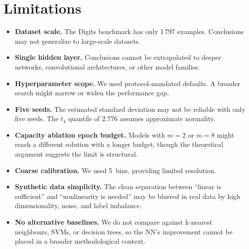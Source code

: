 \documentclass[11pt]{article}
\begin{document}
\section{Limitations}
\label{sec:limitations}

\begin{itemize}[leftmargin=1.5em]
  \item \textbf{Dataset scale.}
    The Digits benchmark has only 1\,797 examples.
    Conclusions may not generalize to large-scale datasets.

  \item \textbf{Single hidden layer.}
    Conclusions cannot be extrapolated to deeper networks, convolutional
    architectures, or other model families.

  \item \textbf{Hyperparameter scope.}
    We used protocol-mandated defaults.
    A broader search might narrow or widen the performance gap.

  \item \textbf{Five seeds.}
    The estimated standard deviation may not be reliable with only five seeds.
    The $t_4$ quantile of $2.776$ assumes approximate normality.

  \item \textbf{Capacity ablation epoch budget.}
    Models with $m=2$ or $m=8$ might reach a different solution with a
    longer budget, though the theoretical argument suggests the limit is
    structural.

  \item \textbf{Coarse calibration.}
    We used 5~bins, providing limited resolution.

  \item \textbf{Synthetic data simplicity.}
    The clean separation between ``linear is sufficient'' and ``nonlinearity
    is needed'' may be blurred in real data by high dimensionality, noise,
    and label imbalance.

  \item \textbf{No alternative baselines.}
    We do not compare against k-nearest neighbours, SVMs, or decision trees,
    so the NN's improvement cannot be placed in a broader methodological
    context.
\end{itemize}
\end{document}
